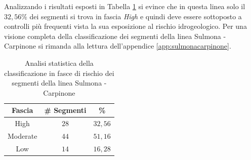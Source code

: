 \newline
Analizzando i risultati esposti in Tabella \ref{percentualesulmonacarpinone} si evince che in questa linea solo il $32,56\%$ dei segmenti si trova in fascia \textit{High} e quindi deve essere sottoposto a controlli più frequenti vista la sua esposizione al rischio idrogeologico. 
Per una visione completa della classificazione dei segmenti della linea Sulmona - Carpinone si rimanda alla lettura dell'appendice \ref{app:sulmonacarpinone}.
\begin{table}[hpt]
\centering
\begin{tabular}{|c|c|c|}
\hline \rowcolor{lightgray}
Fascia   & \# Segmenti & \%    \\ \hline \rowcolor{flamingopink}
High     & $28$           & $32,56$     \\ \hline \rowcolor{icterine}
Moderate & $44$          & $51,16$ \\ \hline \rowcolor{inchworm}
Low      & $14$          & $16,28$ \\ \hline
\end{tabular}
\caption{Analisi statistica della classificazione in fasce di rischio dei segmenti della linea Sulmona - Carpinone}
\label{percentualesulmonacarpinone}
\end{table}
\newpage
